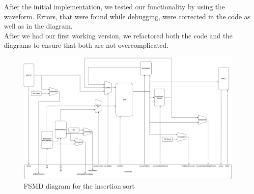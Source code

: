 \documentclass[conference]{IEEEtran}
\begin{document}
After the initial implementation, we tested our functionality by using the waveform. Errors, that were found while debugging, were corrected in the code as well as in the diagram.\\
After we had our first working version, we refactored both the code and the diagrams to ensure that both are not overcomplicated. 
\begin{figure}
    \centering
    \includegraphics[width=1\linewidth]{Images/FSMDInsertionSort.png}
    \caption{FSMD diagram for the insertion sort}
    \label{fig:fsmd}
\end{figure}
\end{document}
